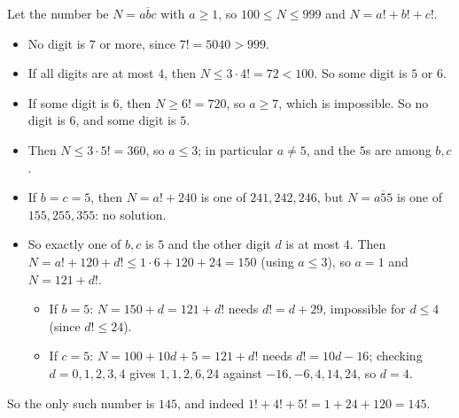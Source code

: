 Let the number be $N=\overline{abc}$ with $a\ge1$, so $100\le N\le999$ and $N=a!+b!+c!$.
\begin{itemize}
\item No digit is $7$ or more, since $7!=5040>999$.
\item If all digits are at most $4$, then $N\le3\cdot4!=72<100$. So some digit is $5$ or $6$.
\item If some digit is $6$, then $N\ge6!=720$, so $a\ge7$, which is impossible. So no digit is $6$, and some digit is $5$.
\item Then $N\le3\cdot5!=360$, so $a\le3$; in particular $a\ne5$, and the $5$s are among $b,c$.
\item If $b=c=5$, then $N=a!+240$ is one of $241,242,246$, but $N=\overline{a55}$ is one of $155,255,355$: no solution.
\item So exactly one of $b,c$ is $5$ and the other digit $d$ is at most $4$. Then $N=a!+120+d!\le1\cdot6+120+24=150$ (using $a\le3$), so $a=1$ and $N=121+d!$.
\begin{itemize}
\item If $b=5$: $N=150+d=121+d!$ needs $d!=d+29$, impossible for $d\le4$ (since $d!\le24$).
\item If $c=5$: $N=100+10d+5=121+d!$ needs $d!=10d-16$; checking $d=0,1,2,3,4$ gives $1,1,2,6,24$ against $-16,-6,4,14,24$, so $d=4$.
\end{itemize}
\end{itemize}
So the only such number is $\boxed{145}$, and indeed $1!+4!+5!=1+24+120=145$.
